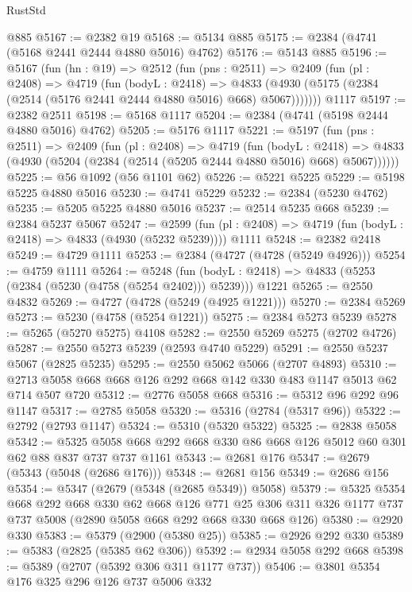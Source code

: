 \begin{lexlean}{RustStd}
\begin{coremodule}
    @885
@5167 := @2382 @19
@5168 := @5134 @885
@5175 := @2384 (@4741 (@5168 @2441 @2444 @4880 @5016) @4762)
@5176 := @5143 @885
@5196 := @5167
    (fun (hn : @19) =>
    @2512
      (fun (pns : @2511) =>
      @2409
        (fun (pl : @2408) =>
        @4719
          (fun (bodyL : @2418) =>
          @4833 (@4930 (@5175 (@2384 (@2514 (@5176 @2441 @2444 @4880 @5016) @668) @5067)))))))
    @1117
@5197 := @2382 @2511
@5198 := @5168 @1117
@5204 := @2384 (@4741 (@5198 @2444 @4880 @5016) @4762)
@5205 := @5176 @1117
@5221 := @5197
    (fun (pns : @2511) =>
    @2409
      (fun (pl : @2408) =>
      @4719
        (fun (bodyL : @2418) =>
        @4833 (@4930 (@5204 (@2384 (@2514 (@5205 @2444 @4880 @5016) @668) @5067))))))
@5225 := @56 @1092 (@56 @1101 @62)
@5226 := @5221 @5225
@5229 := @5198 @5225 @4880 @5016
@5230 := @4741 @5229
@5232 := @2384 (@5230 @4762)
@5235 := @5205 @5225 @4880 @5016
@5237 := @2514 @5235 @668
@5239 := @2384 @5237 @5067
@5247 := @2599
    (fun (pl : @2408) => @4719 (fun (bodyL : @2418) => @4833 (@4930 (@5232 @5239))))
    @1111
@5248 := @2382 @2418
@5249 := @4729 @1111
@5253 := @2384 (@4727 (@4728 (@5249 @4926)))
@5254 := @4759 @1111
@5264 := @5248
    (fun (bodyL : @2418) => @4833 (@5253 (@2384 (@5230 (@4758 (@5254 @2402))) @5239)))
    @1221
@5265 := @2550 @4832
@5269 := @4727 (@4728 (@5249 (@4925 @1221)))
@5270 := @2384 @5269
@5273 := @5230 (@4758 (@5254 @1221))
@5275 := @2384 @5273 @5239
@5278 := @5265 (@5270 @5275) @4108
@5282 := @2550 @5269 @5275 (@2702 @4726)
@5287 := @2550 @5273 @5239 (@2593 @4740 @5229)
@5291 := @2550 @5237 @5067 (@2825 @5235)
@5295 := @2550 @5062 @5066 (@2707 @4893)
@5310 := @2713 @5058 @668 @668 @126 @292 @668 @142 @330 @483 @1147 @5013 @62 @714 @507 @720
@5312 := @2776 @5058 @668
@5316 := @5312 @96 @292 @96 @1147
@5317 := @2785 @5058
@5320 := @5316 (@2784 (@5317 @96))
@5322 := @2792 (@2793 @1147)
@5324 := @5310 (@5320 @5322)
@5325 := @2838 @5058
@5342 := @5325 @5058 @668 @292 @668 @330 @86 @668 @126 @5012 @60 @301 @62 @88 @837 @737 @737 @1161
@5343 := @2681 @176
@5347 := @2679 (@5343 (@5048 (@2686 @176)))
@5348 := @2681 @156
@5349 := @2686 @156
@5354 := @5347 (@2679 (@5348 (@2685 @5349)) @5058)
@5379 := @5325
    @5354
    @668
    @292
    @668
    @330
    @62
    @668
    @126
    @771
    @25
    @306
    @311
    @326
    @1177
    @737
    @737
    @5008
    (@2890 @5058 @668 @292 @668 @330 @668 @126)
@5380 := @2920 @330
@5383 := @5379 (@2900 (@5380 @25))
@5385 := @2926 @292 @330
@5389 := @5383 (@2825 (@5385 @62 @306))
@5392 := @2934 @5058 @292 @668
@5398 := @5389 (@2707 (@5392 @306 @311 @1177 @737))
@5406 := @3801 @5354 @176 @325 @296 @126 @737 @5006 @332

\end{coremodule}
\end{lexlean}

